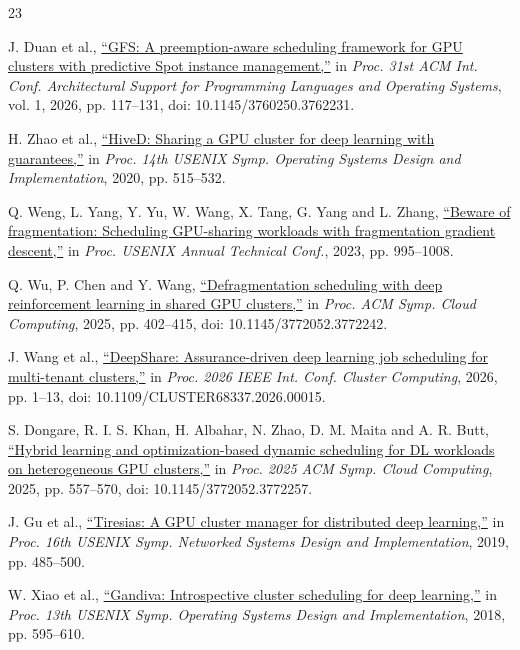\documentclass[conference]{IEEEtran}
\begin{document}
\begin{thebibliography}{23}

J. Duan et al., \href{https://doi.org/10.1145/3760250.3762231}{``GFS: A preemption-aware scheduling framework for GPU clusters with predictive Spot instance management,''} in \emph{Proc. 31st ACM Int. Conf. Architectural Support for Programming Languages and Operating Systems}, vol. 1, 2026, pp. 117--131, doi: 10.1145/3760250.3762231.

H. Zhao et al., \href{https://www.usenix.org/conference/osdi20/presentation/zhao-hanyu}{``HiveD: Sharing a GPU cluster for deep learning with guarantees,''} in \emph{Proc. 14th USENIX Symp. Operating Systems Design and Implementation}, 2020, pp. 515--532.

Q. Weng, L. Yang, Y. Yu, W. Wang, X. Tang, G. Yang and L. Zhang, \href{https://www.usenix.org/conference/atc23/presentation/weng}{``Beware of fragmentation: Scheduling GPU-sharing workloads with fragmentation gradient descent,''} in \emph{Proc. USENIX Annual Technical Conf.}, 2023, pp. 995--1008.

Q. Wu, P. Chen and Y. Wang, \href{https://doi.org/10.1145/3772052.3772242}{``Defragmentation scheduling with deep reinforcement learning in shared GPU clusters,''} in \emph{Proc. ACM Symp. Cloud Computing}, 2025, pp. 402--415, doi: 10.1145/3772052.3772242.

J. Wang et al., \href{https://doi.org/10.1109/CLUSTER68337.2026.00015}{``DeepShare: Assurance-driven deep learning job scheduling for multi-tenant clusters,''} in \emph{Proc. 2026 IEEE Int. Conf. Cluster Computing}, 2026, pp. 1--13, doi: 10.1109/CLUSTER68337.2026.00015.

S. Dongare, R. I. S. Khan, H. Albahar, N. Zhao, D. M. Maita and A. R. Butt, \href{https://doi.org/10.1145/3772052.3772257}{``Hybrid learning and optimization-based dynamic scheduling for DL workloads on heterogeneous GPU clusters,''} in \emph{Proc. 2025 ACM Symp. Cloud Computing}, 2025, pp. 557--570, doi: 10.1145/3772052.3772257.

J. Gu et al., \href{https://www.usenix.org/conference/nsdi19/presentation/gu}{``Tiresias: A GPU cluster manager for distributed deep learning,''} in \emph{Proc. 16th USENIX Symp. Networked Systems Design and Implementation}, 2019, pp. 485--500.

W. Xiao et al., \href{https://www.usenix.org/conference/osdi18/presentation/xiao}{``Gandiva: Introspective cluster scheduling for deep learning,''} in \emph{Proc. 13th USENIX Symp. Operating Systems Design and Implementation}, 2018, pp. 595--610.


\end{thebibliography}
\end{document}
